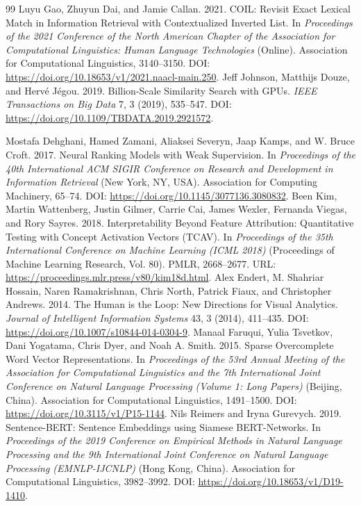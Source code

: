 \documentclass[sigconf,anonymous,screen]{acmart}
\begin{document}
\begin{thebibliography}{99}
 Luyu Gao, Zhuyun Dai, and Jamie Callan. 2021. COIL: Revisit Exact Lexical Match in Information Retrieval with Contextualized Inverted List. In \textit{Proceedings of the 2021 Conference of the North American Chapter of the Association for Computational Linguistics: Human Language Technologies} (Online). Association for Computational Linguistics, 3140--3150. DOI: \url{https://doi.org/10.18653/v1/2021.naacl-main.250}.
 Jeff Johnson, Matthijs Douze, and Herv\'{e} J\'{e}gou. 2019. Billion-Scale Similarity Search with {GPUs}. \textit{IEEE Transactions on Big Data} 7, 3 (2019), 535--547. DOI: \url{https://doi.org/10.1109/TBDATA.2019.2921572}.

 Mostafa Dehghani, Hamed Zamani, Aliaksei Severyn, Jaap Kamps, and W. Bruce Croft. 2017. Neural Ranking Models with Weak Supervision. In \textit{Proceedings of the 40th International ACM SIGIR Conference on Research and Development in Information Retrieval} (New York, NY, USA). Association for Computing Machinery, 65--74. DOI: \url{https://doi.org/10.1145/3077136.3080832}.
 Been Kim, Martin Wattenberg, Justin Gilmer, Carrie Cai, James Wexler, Fernanda Viegas, and Rory Sayres. 2018. Interpretability Beyond Feature Attribution: Quantitative Testing with Concept Activation Vectors (TCAV). In \textit{Proceedings of the 35th International Conference on Machine Learning (ICML 2018)} (Proceedings of Machine Learning Research, Vol. 80). PMLR, 2668--2677. URL: \url{https://proceedings.mlr.press/v80/kim18d.html}.
 Alex Endert, M. Shahriar Hossain, Naren Ramakrishnan, Chris North, Patrick Fiaux, and Christopher Andrews. 2014. The Human is the Loop: New Directions for Visual Analytics. \textit{Journal of Intelligent Information Systems} 43, 3 (2014), 411--435. DOI: \url{https://doi.org/10.1007/s10844-014-0304-9}.
 Manaal Faruqui, Yulia Tsvetkov, Dani Yogatama, Chris Dyer, and Noah A. Smith. 2015. Sparse Overcomplete Word Vector Representations. In \textit{Proceedings of the 53rd Annual Meeting of the Association for Computational Linguistics and the 7th International Joint Conference on Natural Language Processing (Volume 1: Long Papers)} (Beijing, China). Association for Computational Linguistics, 1491--1500. DOI: \url{https://doi.org/10.3115/v1/P15-1144}.
 Nils Reimers and Iryna Gurevych. 2019. Sentence-BERT: Sentence Embeddings using Siamese BERT-Networks. In \textit{Proceedings of the 2019 Conference on Empirical Methods in Natural Language Processing and the 9th International Joint Conference on Natural Language Processing (EMNLP-IJCNLP)} (Hong Kong, China). Association for Computational Linguistics, 3982--3992. DOI: \url{https://doi.org/10.18653/v1/D19-1410}.
\end{thebibliography}
\end{document}
